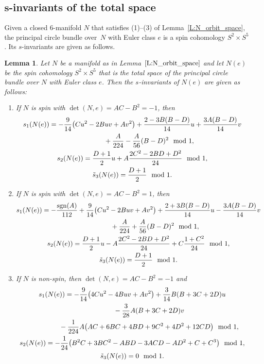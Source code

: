 \documentclass[pdftex]{sigma}
\numberwithin{equation}{section}
\newtheorem{Lemma}[Theorem]{Lemma}
\theoremstyle{definition}
\numberwithin{table}{section}
\begin{document}
\subsection[s-invariants of the total space]{$\boldsymbol{s}$-invariants of the total space}\label{SS:s-inv}

Given a closed $6$-manifold $N$ that satisfies (1)--(3) of Lemma~\ref{L:N_orbit_space}, the principal circle bundle over~$N$ with Euler class $e$ is a spin cohomology $S^2\times S^5$. Its $s$-invariants are given as follows.

\begin{Lemma}\label{L:s-inv}
	Let $N$ be a manifold as in Lemma~$\ref{L:N_orbit_space}$ and let $N(e)$ be the spin cohomology $S^2\times S^5$ that is the total space of the principal circle bundle over $N$ with Euler class $e$. Then the $s$-invariants of $N(e)$ are given as follows:
	\begin{enumerate}\itemsep=0pt
		\item[$(1)$] If $N$ is spin with $\det(N,e)=AC-B^2=-1$, then
		\begin{gather*}
			s_1(N(e))= -\frac{9}{14}\bigl(Cu^2-2Buv+Av^2\bigr)+\frac{2-3B(B-D)}{14}u+\frac{3A(B-D)}{14}v\\
			 \hphantom{s_1(N(e))=}{} +\frac{A}{224}-\frac{A}{56}(B-D)^2\mod 1,\\
			s_2(N(e))= \frac{D+1}{2}u+A\frac{2C^2-2BD+D^2}{24}\mod 1,\\
			\tilde{s}_3(N(e))= \frac{D+1}{2}\mod 1.
		\end{gather*}
		\item[$(2)$] If $N$ is spin with $\det(N,e)=AC-B^2=1$, then
		\begin{gather*}
			s_1(N(e))= -\frac{\mathrm{sgn}(A)}{112}+\frac{9}{14}\bigl(Cu^2-2Buv+Av^2\bigr)+\frac{2+3B(B-D)}{14}u-\frac{3A(B-D)}{14}v\\
			\hphantom{s_1(N(e))=}{} +\frac{A}{224}+\frac{A}{56}(B-D)^2\mod 1,\\
			s_2(N(e))= \frac{D+1}{2}u-A\frac{2C^2-2BD+D^2}{24}+C\frac{1+C^2}{24}\mod 1,\\
			\tilde{s}_3(N(e))= \frac{D+1}{2}\mod 1.
		\end{gather*}
		\item[$(3)$] If $N$ is non-spin, then $\det(N,e)=AC-B^2=-1$ and
		\begin{gather*}
			s_1(N(e))= -\frac{9}{14}\bigl(4Cu^2-4Buv+Av^2\bigr)+\frac{3}{14}B(B+3C+2D)u\\
			\hphantom{s_1(N(e))=}{} -\frac{3}{28}A(B+3C+2D)v\\
			\hphantom{s_1(N(e))=}{} -\frac{1}{224}A\bigl(AC+6BC+4BD+9C^2+4D^2+12CD\bigr)\mod 1,\\
			s_2(N(e))= -\frac{1}{24}\bigl(B^2C+3BC^2-ABD-3ACD-AD^2+C+C^3\bigr)\mod 1,\\
			\tilde{s}_3(N(e))= 0\mod 1.
		\end{gather*}
	\end{enumerate}
\end{Lemma}
\end{document}
